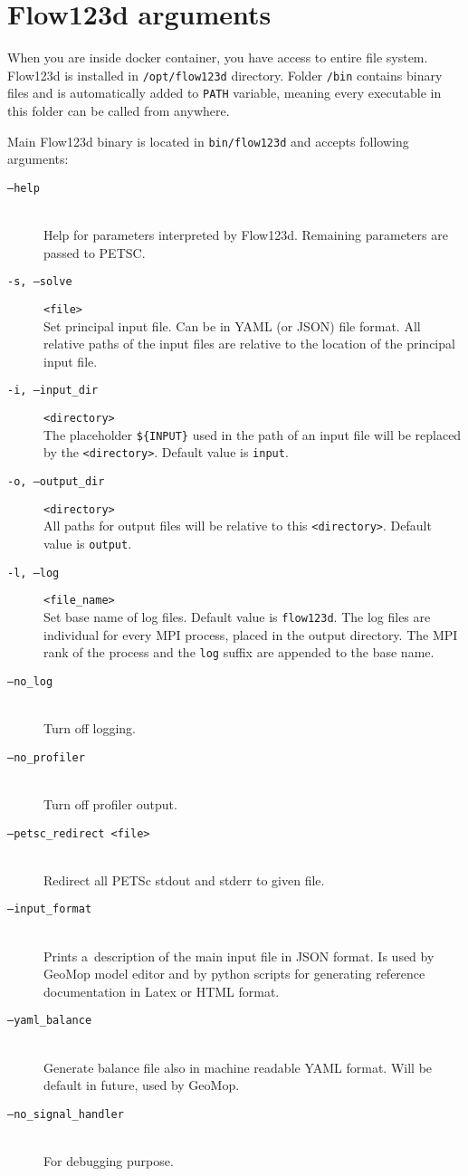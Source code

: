 \section{Flow123d arguments}
When you are inside docker container, you have access to entire file system. Flow123d is installed in
\verb'/opt/flow123d' directory. Folder \verb'/bin' contains binary files and is automatically
added to \verb'PATH' variable, meaning every executable in this folder can be called from anywhere.

Main Flow123d binary is located in \verb'bin/flow123d' and accepts following arguments:


\begin{description}
 \item[{\tt --help}] \hfill\\
        Help for parameters interpreted by Flow123d. Remaining parameters are passed to PETSC.
 \item[ {\tt -s, --solve} ] \verb'<file>' \hfill\\
 	 Set principal input file. Can be in YAML (or  JSON) file format. All relative paths of the input
 	 files are relative to the location of the principal input file.
 \item[{\tt -i, --input\_dir}] \verb'<directory>' \hfill\\
 	The placeholder \verb"${INPUT}" %
  	used in the path of an input file will be replaced by the \verb'<directory>'. Default value is \verb'input'.
 \item[{\tt -o, --output\_dir}] \verb'<directory>' \hfill\\
 	All paths for output files will be relative to this \verb'<directory>'. Default value is \verb'output'.
 \item[{\tt -l, --log}] \verb'<file_name>' \hfill\\
 	Set base name of log files. Default value is \verb'flow123d'. The log files are individual for every MPI process, placed in the output directory.
 	The MPI rank of the process and the \verb'log' suffix are appended to the base name.
 \item[{\tt --no\_log}] \hfill\\
        Turn off logging.
 \item[{\tt --no\_profiler}] \hfill\\
        Turn off profiler output.
 \item[{\tt --petsc\_redirect <file>}] \hfill\\
        Redirect all PETSc stdout and stderr to given file.
 \item[{\tt --input\_format}] \hfill\\
        Prints a~description of the main input file in JSON format. Is used by GeoMop model editor and by python scripts for
        generating reference documentation in Latex or HTML format.
 \item[{\tt --yaml\_balance}] \hfill\\
        Generate balance file also in machine readable YAML format. Will be default in future, used by GeoMop.
 \item[{\tt --no\_signal\_handler}] \hfill\\
        For debugging purpose.

\end{description}
